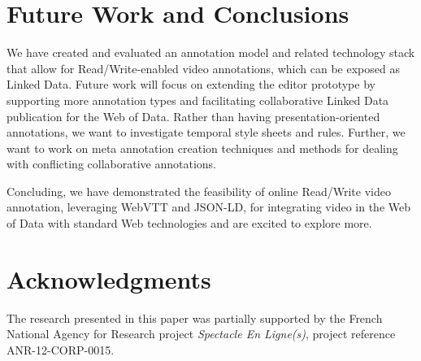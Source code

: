 \documentclass{sig-alternate}
\def\JSONLD{\mbox{JSON-LD}}
\begin{document}
\section{Future Work and Conclusions}
\label{sec:future-work-conclusions}

We have created and evaluated an annotation model
and related technology stack
that allow for Read/Write-enabled video annotations,
which can be exposed as Linked Data.
Future work will focus on extending the editor prototype
by supporting more annotation types and
facilitating collaborative Linked Data publication
for the Web of Data.
Rather than having presentation-oriented annotations,
we want to investigate temporal style sheets and rules.
Further, we want to work on meta annotation creation techniques
and methods for dealing with conflicting collaborative annotations.

Concluding, we have demonstrated the feasibility of online
Read/Write video annotation, leveraging WebVTT
and \JSONLD, for integrating video in the Web of Data
with standard Web technologies
and are excited to explore more.

\section*{Acknowledgments}
\footnotesize
The research presented in this paper was partially supported
by the French National Agency for Research  project
\emph{Spectacle En Ligne(s)}, project reference
\mbox{ANR-12-CORP-0015}.

\normalsize


\end{document}
